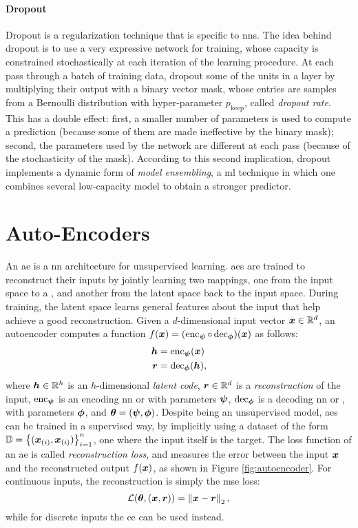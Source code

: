 \paragraph{Dropout}
Dropout \citep{srivastava2014dropout} is a regularization technique that is specific to \glspl{nn}. The idea behind dropout is to use a very expressive network for training, whose capacity is constrained stochastically at each iteration of the learning procedure. At each pass through a batch of training data, dropout  some of the units in a layer by multiplying their output with a binary vector mask, whose entries are samples from a Bernoulli distribution with hyper-parameter $p_{\mathrm{keep}}$, called \emph{dropout rate}. This has a double effect: first, a smaller number of parameters is used to compute a prediction (because some of them are made ineffective by the binary mask); second, the parameters used by the network are different at each pass (because of the stochasticity of the mask). According to this second implication, dropout implements a dynamic form of \emph{model ensembling}, a \gls{ml} technique in which one combines several low-capacity model to obtain a stronger predictor.

\section{Auto-Encoders}
An \gls{ae} \citep{baldi2012autoenc} is a \gls{nn} architecture for unsupervised learning. \glspl{ae} are trained to reconstruct their inputs by jointly learning two mappings, one from the input space to a , and another from the latent space back to the input space. During training, the latent space learns general features about the input that help achieve a good reconstruction. Given a $d$-dimensional input vector $\Vector{x} \in \Real^d$, an autoencoder computes a function $f(\Vector{x}) = (\EncoderNet \circ \DecoderNet)(\Vector{x})$ as follows:
\begin{align*}
    \Vector{h} &= \EncoderNet(\Vector{x})\\
    \Vector{r} &= \DecoderNet(\Vector{h}),
\end{align*}
where $\Vector{h} \in \Real^h$ is an $h$-dimensional \emph{latent code}, $\Vector{r} \in \Real^d$ is a \emph{reconstruction} of the input, $\operatorname{enc}_{\boldsymbol{\psi}}$ is an encoding \gls{nn} or  with parameters $\boldsymbol{\psi}$, $\operatorname{dec}_{\boldsymbol{\phi}}$ is a decoding \gls{nn} or , with parameters $\boldsymbol{\phi}$, and $\boldsymbol{\theta} = (\boldsymbol{\psi}, \boldsymbol{\phi})$. Despite being an unsupervised model, \glspl{ae} can be trained in a supervised way, by implicitly using a dataset of the form $\Data = \Set{(\PatternVector{x}{i}, \PatternVector{x}{i})}_{i=1}^n$, \ie one where the input itself is the target. The loss function of an \gls{ae} is called \emph{reconstruction loss}, and measures the error between the input $\Vector{x}$ and the reconstructed output $f(\Vector{x})$, as shown in Figure \ref{fig:autoencoder}. For continuous inputs, the reconstruction is simply the \gls{mse} loss:
$$\Loss(\Param, (\Vector{x}, \Vector{r})) = \Norm{\Vector{x}-\Vector{r}}_2,$$
while for discrete inputs the \gls{ce} can be used instead.

